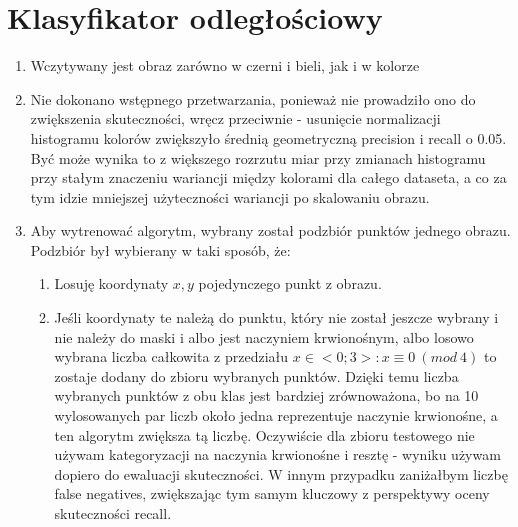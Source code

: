 \documentclass[12pt]{article}
\begin{document}
\section{Klasyfikator odległościowy}
\begin{enumerate}
	\item Wczytywany jest obraz zarówno w czerni i bieli, jak i w kolorze
	\item Nie dokonano wstępnego przetwarzania, ponieważ nie prowadziło ono do zwiększenia skuteczności, wręcz przeciwnie - usunięcie normalizacji histogramu kolorów zwiększyło średnią geometryczną precision i recall o 0.05. Być może wynika to z większego rozrzutu miar przy zmianach histogramu przy stałym znaczeniu wariancji między kolorami dla całego dataseta, a co za tym idzie mniejszej użyteczności wariancji po skalowaniu obrazu.
	\item Aby wytrenować algorytm, wybrany został podzbiór punktów jednego obrazu. Podzbiór był wybierany w taki sposób, że:
	\begin{enumerate}
		\item Losuję koordynaty \(x, y\) pojedynczego punkt z obrazu.
		\item Jeśli koordynaty te należą do punktu, który nie został jeszcze wybrany i nie należy do maski i albo jest naczyniem krwionośnym, albo losowo wybrana liczba całkowita z przedziału \(x \in <0;3>: x \equiv 0\ (mod\ 4)\) to zostaje dodany do zbioru wybranych punktów. Dzięki temu liczba wybranych punktów z obu klas jest bardziej zrównoważona, bo na 10 wylosowanych par liczb około jedna reprezentuje naczynie krwionośne, a ten algorytm zwiększa tą liczbę. Oczywiście dla zbioru testowego nie używam kategoryzacji na naczynia krwionośne i resztę - wyniku używam dopiero do ewaluacji skuteczności. W innym przypadku zaniżałbym liczbę false negatives, zwiększając tym samym kluczowy z perspektywy oceny skuteczności recall.
		

\end{enumerate}
\end{enumerate}
\end{document}

